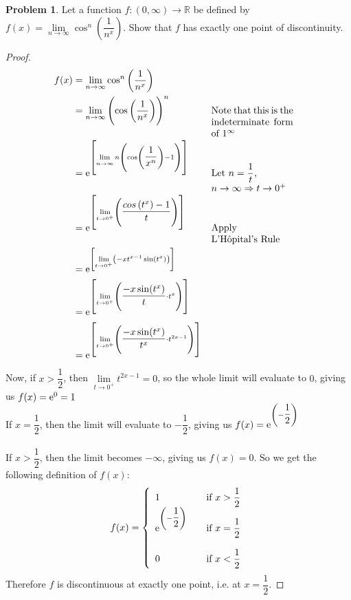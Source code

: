 \documentclass[14]{article}
\theoremstyle{definition}
\newtheorem{prob}{Problem}
\begin{document}
\pagebreak
\begin{prob}
Let a function $f:(0, \infty) \to \mathbb{R}$ be defined by $f(x) = \lim\limits_{n \to \infty} \cos^n\left(\dfrac1{n^x}\right)$. Show that $f$ has exactly one point of discontinuity.\\
\begin{proof}
\begin{align*}
f(x) &= \lim\limits_{n \to \infty} \cos^n\left(\dfrac1{n^x}\right)\\
&= \lim\limits_{n \to \infty} \left(\cos\left( \dfrac1{n^x} \right) \right)^n && \parbox[t]{3cm}{Note that this is the indeterminate form of $1^\infty$}\\
&={\rm e}^{\left[
\lim\limits_{n \to \infty} n \left( \cos\left(\dfrac1{x^n}\right) - 1 \right)
\right]} && \parbox[t]{3cm}{Let $n = \dfrac1t$,\\$n \to \infty \Rightarrow t \to 0^+$}\\
&={\rm e}^{\left[
\lim\limits_{t \to 0^+} \left( \dfrac{cos\left(t^x\right) - 1}{t} \right)
\right]} && \parbox[t]{3cm}{Apply\\ L'Hôpital's Rule}\\
&={\rm e}^{\left[
\lim\limits_{t \to 0^+} \left( -x t^{x-1} \sin(t^x) \right)
\right]}\\
&={\rm e}^{\left[
\lim\limits_{t \to 0^+} \left( \dfrac{-x \sin(t^x)}{t} \cdot t^{x} \right)
\right]}\\
&={\rm e}^{\left[
\lim\limits_{t \to 0^+} \left( \dfrac{-x \sin(t^x)}{t^x} \cdot t^{2x-1} \right)
\right]}\\
\end{align*}
Now, if $x > \dfrac12$, then $\lim\limits_{t \to 0^+} t^{2x-1} = 0$, so the whole limit will evaluate to $0$, giving us $f(x) ={\rm e}^0 = 1$\\
If $x = \dfrac12$, then the limit will evaluate to $-\dfrac12$, giving us $f(x) ={\rm e}^{\left(-\dfrac12\right)}$\\\\
If $x > \dfrac12$, then the limit becomes $-\infty$, giving us $f(x) = 0$.
So we get the following definition of $f(x)$:\\
\[
f(x) = \left\{
        \begin{array}{ll}
            1 & \quad \text{if } x > \dfrac12 \\
            {\rm e}^{\left(-\dfrac12\right)} & \quad \text{if } x = \dfrac12\\\\
            0 & \quad \text{if } x < \dfrac12
        \end{array}
    \right.
\]
Therefore $f$ is discontinuous at exactly one point, i.e. at $x = \dfrac12$.
\end{proof}
\end{prob}
\end{document}
